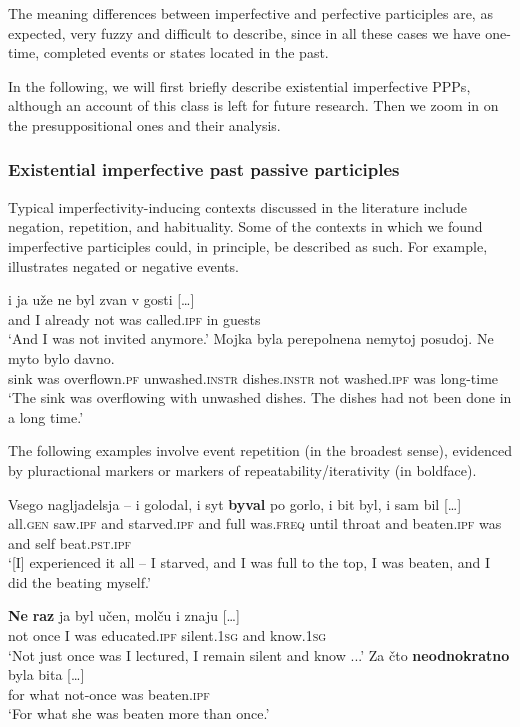 \documentclass[output=paper,modfonts,newtxmath,hidelinks
]{langscibook}
\begin{document}
\noindent The meaning differences between imperfective and perfective participles are, as expected, very fuzzy and difficult to describe, since in all these cases we have one-time, completed events or states located in the past. 

In the following,  we will first briefly describe existential imperfective PPPs, although an account of this class is left for future research. Then we  zoom in on the presuppositional ones and their analysis.

\subsubsection{Existential imperfective past passive participles}

Typical imperfectivity-inducing contexts discussed in the literature include negation, repetition, and habituality. Some of the contexts in which we found imperfective participles could, in principle, be described as such. For example,  illustrates negated or negative events. 

\ea\label{negOF}
\ea\gll	[\dots] i ja uže ne byl zvan v gosti [\dots]\\
	{} and I already not was called.\textsc{ipf} in guests \\
\glt `And I was not invited anymore.' 
\ex\gll	Mojka byla perepolnena nemytoj posudoj. Ne myto bylo davno.\\
   	sink was overflown.\textsc{pf} unwashed.\textsc{instr} dishes.\textsc{instr} not washed.\textsc{ipf} was long-time\\
\glt	`The sink was overflowing with unwashed dishes. The dishes had not been done in a long time.'\label{17c}
\z\z

\noindent The following examples involve event repetition (in the broadest sense), evidenced by pluractional markers  or markers of repeatability/iterativity  (in boldface).

\ea\gll	Vsego nagljadelsja -- i golodal, i syt \textbf{byval} po gorlo, i bit byl, i sam bil [\dots] \label{golodal}\\
	all.\textsc{gen} saw.\textsc{ipf} {} and starved.\textsc{ipf} and full was.\textsc{freq} until throat and beaten.\textsc{ipf} was and self beat.\textsc{pst}.\textsc{ipf}\\
\glt	`[I] experienced it all -- I starved, and I was full to the top, I was beaten, and I did the beating myself.'\label{bit} 
\z

\ea\label{neraz}
\ea\gll	\textbf{Ne} \textbf{raz} ja byl učen, molču i znaju [\dots]\\ 
	not once I was educated.\textsc{ipf} silent.\textsc{1sg} and know.\textsc{1sg}\\
\glt	`Not just once was I lectured, I remain silent and know ...'
\ex\gll	Za čto \textbf{neodnokratno} byla bita [\dots]\\
	for what not-once was beaten.\textsc{ipf}\\
\glt	`For what she was beaten more than once.'
\z\z
	
\end{document}
